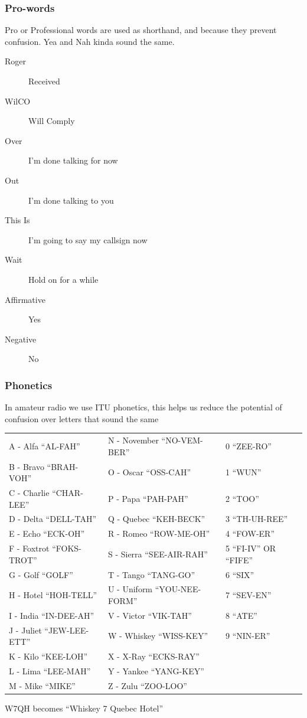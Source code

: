 \documentclass[10pt]{beamer}
\begin{document}
\begin{frame}
\frametitle{Pro-words}
Pro or Professional words are used as shorthand, and because they prevent confusion. Yea and Nah kinda sound the same.
\begin{description}
\item[Roger] Received
\item[WilCO] Will Comply
\item[Over] I'm done talking for now
\item[Out] I'm done talking to you
\item[This Is] I'm going to say my callsign now
\item[Wait] Hold on for a while
\item[Affirmative] Yes
\item[Negative] No
\end{description}
\end{frame}

\begin{frame}
\frametitle{Phonetics}
In amateur radio we use ITU phonetics, this helps us reduce the potential of confusion over letters that sound the same
\begin{tabular}{l l l}
\scriptsize A - Alfa ``AL-FAH''& \scriptsize  N - November ``NO-VEM-BER'' & \scriptsize  0 ``ZEE-RO''\\
\scriptsize B - Bravo ``BRAH-VOH''& \scriptsize  O - Oscar ``OSS-CAH'' & \scriptsize  1 ``WUN''\\
\scriptsize C - Charlie ``CHAR-LEE''& \scriptsize  P - Papa ``PAH-PAH'' & \scriptsize  2 ``TOO''\\
\scriptsize D - Delta ``DELL-TAH''& \scriptsize  Q - Quebec ``KEH-BECK'' & \scriptsize  3 ``TH-UH-REE''\\
\scriptsize E - Echo ``ECK-OH''& \scriptsize  R - Romeo ``ROW-ME-OH'' & \scriptsize  4 ``FOW-ER''\\
\scriptsize F - Foxtrot ``FOKS-TROT''& \scriptsize  S - Sierra ``SEE-AIR-RAH'' & \scriptsize  5 ``FI-IV'' OR ``FIFE''\\
\scriptsize G - Golf ``GOLF''& \scriptsize  T - Tango ``TANG-GO'' & \scriptsize  6 ``SIX''\\
\scriptsize H - Hotel ``HOH-TELL''& \scriptsize  U - Uniform ``YOU-NEE-FORM'' & \scriptsize  7 ``SEV-EN''\\
\scriptsize I - India ``IN-DEE-AH''& \scriptsize  V - Victor ``VIK-TAH'' & \scriptsize  8 ``ATE''\\
\scriptsize J - Juliet ``JEW-LEE-ETT''& \scriptsize  W - Whiskey ``WISS-KEY'' & \scriptsize  9 ``NIN-ER''\\
\scriptsize K - Kilo ``KEE-LOH''& \scriptsize  X - X-Ray ``ECKS-RAY''\\
\scriptsize L - Lima ``LEE-MAH''& \scriptsize  Y - Yankee ``YANG-KEY''\\
\scriptsize M - Mike ``MIKE''& \scriptsize  Z - Zulu ``ZOO-LOO''\\
\end{tabular}
W7QH becomes ``Whiskey 7 Quebec Hotel'' 
\end{frame}
\end{document}
